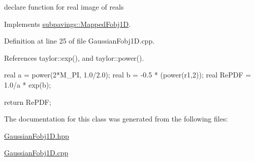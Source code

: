 declare function for real image of reals 



\-Implements \hyperlink{classsubpavings_1_1MappedFobj1D_abee3fbd4c06d7d2f6e276f31d485eb7c}{subpavings\-::\-Mapped\-Fobj1\-D}.



\-Definition at line 25 of file \-Gaussian\-Fobj1\-D.\-cpp.



\-References taylor\-::exp(), and taylor\-::power().


\begin{DoxyCode}
{
    real a = power(2*M_PI, 1.0/2.0);
    real b = -0.5 * (power(r1,2));
    real RePDF = 1.0/a * exp(b);
    
    return RePDF;
}
\end{DoxyCode}


\-The documentation for this class was generated from the following files\-:\begin{DoxyCompactItemize}
\item 
\hyperlink{GaussianFobj1D_8hpp}{\-Gaussian\-Fobj1\-D.\-hpp}\item 
\hyperlink{GaussianFobj1D_8cpp}{\-Gaussian\-Fobj1\-D.\-cpp}\end{DoxyCompactItemize}
